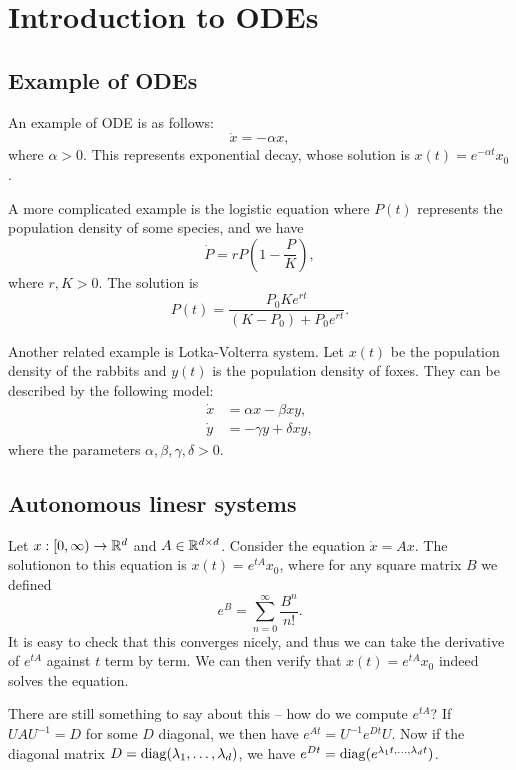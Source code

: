 \documentclass[a4paper]{article}
\author{Notes taken by \nauthor\vspace{5pt}\\
  Lectures by Gautum Iyer\vspace{5pt}\\
  Carnegie Mellon University}
\begin{document}
\maketitle

\tableofcontents

\section{Introduction to ODEs}

\subsection{Example of ODEs}

An example of ODE is as follows:
\[
  \dot{x} = - \alpha x,
\]
where $\alpha > 0$. This represents exponential decay, whose solution is
  $x(t) = e^{-\alpha t} x_0$.

A more complicated example is the logistic equation where $P(t)$
represents the population density of some species, and we have
\[
  \dot{P} = r P \left( 1 - \frac{P}{K} \right),
\]
where $r, K > 0$. The solution is
\[
  P(t) = \frac{P_0 K e^{rt}}{(K - P_0) + P_0 e^{rt}}.
\]

Another related example is Lotka-Volterra system. Let $x(t)$ be the
population density of the rabbits and $y(t)$ is the population density of
foxes. They can be described by the following model:
\begin{align*}
  \dot{x} & = \alpha x - \beta x y,    \\
  \dot{y} & = - \gamma y + \delta x y,
\end{align*}
where the parameters $\alpha, \beta, \gamma, \delta > 0$.

\subsection{Autonomous linesr systems}

Let $x : [0, \infty) \to \mathbb{R}^d$ and $A \in \mathbb{R}^{d \times d}$. Consider the
equation $\dot{x} = A x$. The solutionon to this equation is $x(t) =
e^{tA} x_0$, where for any square matrix $B$ we defined
\[
  e^B = \sum_{n = 0}^\infty \frac{B^n}{n!}.
\]
It is easy to check that this converges nicely, and thus we can take the
  derivative of $e^{tA}$ against $t$ term by term. We can then verify that
  $x(t) = e^{tA} x_0$ indeed solves the equation.

There are still something to say about this -- how do we compute $e^{tA}$?
If $UAU^{-1} = D$ for some $D$ diagonal, we then have $e^{At} = U^{-1}
e^{Dt} U$. Now if the diagonal matrix $D = \operatorname{diag}(\lambda_1, \dots,
\lambda_d)$, we have $e^{Dt} = \operatorname{diag}(e^{\lambda_1 t, \dots, \lambda_d
t})$.
\end{document}
